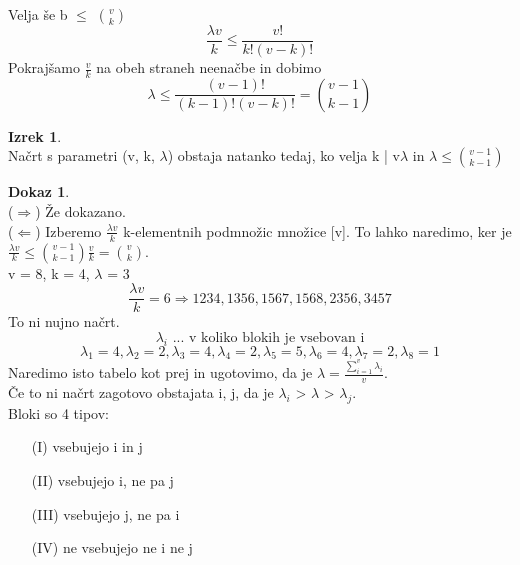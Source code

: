 \documentclass[a4paper,12pt]{article}
\theoremstyle{definition}
\newtheorem{theorem}[counter]{Izrek}
\newtheorem{pro}[counter]{Dokaz}
\theoremstyle{remark}
\begin{document}
Velja še b $\leqslant$ $\binom{v}{k}$
\[\frac{\lambda v}{k} \leqslant \frac{v!}{k! (v-k)!}\]
Pokrajšamo $\frac{v}{k}$ na obeh straneh neenačbe in dobimo
\[\lambda \leqslant \frac{(v - 1)!}{(k - 1)! (v - k)!} = \binom{v-1}{k-1}\]

\begin{theorem}\mbox{}\\
Načrt s parametri (v, k, $\lambda$) obstaja natanko tedaj, ko velja k | v$\lambda$ in $\lambda \leqslant \binom{v - 1}{k - 1}$
\end{theorem}

\begin{pro}\mbox{}\\
($\Rightarrow$) Že dokazano.\\
($\Leftarrow$) Izberemo $\frac{\lambda v}{k}$ k-elementnih podmnožic množice [v]. To lahko naredimo, ker je $\frac{\lambda v}{k} \leqslant \binom{v - 1}{k - 1} \frac{v}{k} = \binom{v}{k}$.\\

v = 8, k = 4, $\lambda$ = 3\\
\[\frac{\lambda v}{k} = 6  \Rightarrow 1234, 1356, 1567, 1568, 2356, 3457\]
To ni nujno načrt.
\[\lambda_i \text{ ... v koliko blokih je vsebovan i}\]
\[\lambda_1 = 4, \lambda_2 = 2, \lambda_3 = 4, \lambda_4 = 2, \lambda_5 = 5, \lambda_6 = 4, \lambda_7 = 2, \lambda_8 = 1\]
Naredimo isto tabelo kot prej in ugotovimo, da je $\lambda = \frac{\sum_{i = 1}^v \lambda_i}{v}$.\\
Če to ni načrt zagotovo obstajata i, j, da je $\lambda_i$ > $\lambda$ > $\lambda_j$.\\

Bloki so 4 tipov:
\begin{itemize}
    \item[(I)] vsebujejo i in j
    \item[(II)] vsebujejo i, ne pa j
    \item[(III)] vsebujejo j, ne pa i
    \item[(IV)] ne vsebujejo ne i ne j\\
\end{itemize}


\end{pro}
\end{document}
